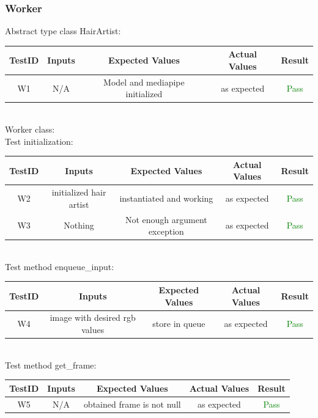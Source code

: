 \documentclass[12pt, titlepage]{article}
\begin{document}
\subsubsection{Worker}
Abstract type class HairArtist: \\
\newline
\begin{tabular}{ |c|c|c|c|c| } 
 \hline
 TestID & Inputs & Expected Values & Actual Values & Result \\ 
 \hline
W1 & N/A & Model and mediapipe initialized & as expected & \textcolor{green}{Pass} \\ 
 \hline
\end{tabular} 
\\ \newline
Worker class: \\
Test initialization: \\
\newline
\begin{tabular}{ |c|c|c|c|c| } 
 \hline
 TestID & Inputs & Expected Values & Actual Values & Result \\ 
 \hline
W2 & initialized hair artist & instantiated and working & as expected & \textcolor{green}{Pass} \\
W3 & Nothing & Not enough argument exception & as expected & \textcolor{green}{Pass} \\
 \hline
\end{tabular}
\\ \newline
Test method enqueue\_input: \\
\newline
\begin{tabular}{ |c|c|c|c|c| } 
 \hline
 TestID & Inputs & Expected Values & Actual Values & Result \\ 
 \hline
W4 & image with desired rgb values & store in queue & as expected & \textcolor{green}{Pass} \\
 \hline
\end{tabular}
\\ \newline
Test method get\_frame: \\
\newline
\begin{tabular}{ |c|c|c|c|c| } 
 \hline
 TestID & Inputs & Expected Values & Actual Values & Result \\ 
 \hline
W5 & N/A & obtained frame is not null & as expected & \textcolor{green}{Pass} \\
 \hline
\end{tabular}
\end{document}
